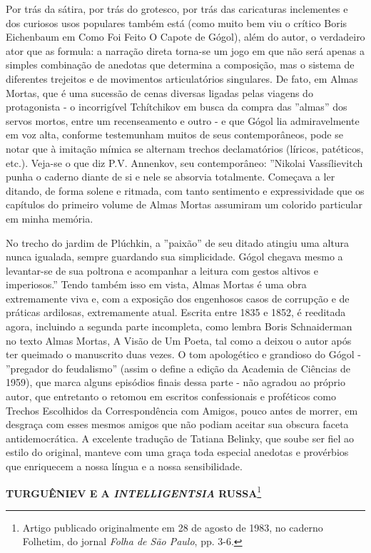 Por trás da sátira, por trás do grotesco, por trás das caricaturas
inclementes e dos curiosos usos populares também está (como muito bem
viu o crítico Boris Eichenbaum em Como Foi Feito O Capote de Gógol),
além do autor, o verdadeiro ator que as formula: a narração direta
torna-se um jogo em que não será apenas a simples combinação de anedotas
que determina a composição, mas o sistema de diferentes trejeitos e de
movimentos articulatórios singulares. De fato, em Almas Mortas, que é
uma sucessão de cenas diversas ligadas pelas viagens do protagonista - o
incorrigível Tchítchikov em busca da compra das ''almas'' dos servos
mortos, entre um recenseamento e outro - e que Gógol lia admiravelmente
em voz alta, conforme testemunham muitos de seus contemporâneos, pode se
notar que à imitação mímica se alternam trechos declamatórios (líricos,
patéticos, etc.). Veja-se o que diz P.V. Annenkov, seu contemporâneo:
''Nikolai Vassílievitch punha o caderno diante de si e nele se absorvia
totalmente. Começava a ler ditando, de forma solene e ritmada, com tanto
sentimento e expressividade que os capítulos do primeiro volume de Almas
Mortas assumiram um colorido particular em minha memória.

No trecho do jardim de Plúchkin, a ''paixão'' de seu ditado atingiu uma
altura nunca igualada, sempre guardando sua simplicidade. Gógol chegava
mesmo a levantar-se de sua poltrona e acompanhar a leitura com gestos
altivos e imperiosos.'' Tendo também isso em vista, Almas Mortas é uma
obra extremamente viva e, com a exposição dos engenhosos casos de
corrupção e de práticas ardilosas, extremamente atual. Escrita entre
1835 e 1852, é reeditada agora, incluindo a segunda parte incompleta,
como lembra Boris Schnaiderman no texto Almas Mortas, A Visão de Um
Poeta, tal como a deixou o autor após ter queimado o manuscrito duas
vezes. O tom apologético e grandioso do Gógol - ''pregador do
feudalismo'' (assim o define a edição da Academia de Ciências de 1959),
que marca alguns episódios finais dessa parte - não agradou ao próprio
autor, que entretanto o retomou em escritos confessionais e proféticos
como Trechos Escolhidos da Correspondência com Amigos, pouco antes de
morrer, em desgraça com esses mesmos amigos que não podiam aceitar sua
obscura faceta antidemocrática. A excelente tradução de Tatiana Belinky,
que soube ser fiel ao estilo do original, manteve com uma graça toda
especial anedotas e provérbios que enriquecem a nossa língua e a nossa
sensibilidade.

\textbf{TURGUÊNIEV E A \emph{INTELLIGENTSIA} RUSSA}\footnote{Artigo
  publicado originalmente em 28 de agosto de 1983, no caderno Folhetim,
  do jornal \emph{Folha de São Paulo}, pp. 3-6.}

